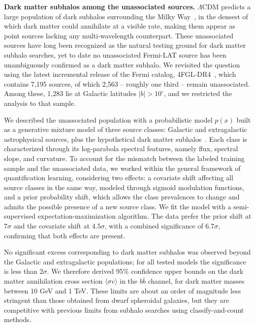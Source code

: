 
\textbf{Dark matter subhalos among the unassociated sources.} $\Lambda$CDM predicts a large population of dark subhalos surrounding the Milky Way~\cite{Springel:2008cc}, in the densest of which dark matter could annihilate at a visible rate, making them appear as point sources lacking any multi-wavelength counterpart. These unassociated sources have long been recognized as the natural testing ground for dark matter subhalo searches, yet to date no unassociated Fermi-LAT source has been unambiguously confirmed as a dark matter subhalo. We revisited the question using the latest incremental release of the Fermi catalog, 4FGL-DR4~\cite{Ballet:2023qzs}, which contains 7,195 sources, of which 2,563 -- roughly one third -- remain unassociated. Among these, 1,283 lie at Galactic latitudes $|b| > 10^\circ$, and we restricted the analysis to that sample.

We described the unassociated population with a probabilistic model $p(x)$ built as a generative mixture model of three source classes: Galactic and extragalactic astrophysical sources, plus the hypothetical dark matter subhalos~\cite{Amerio:2025fhz}. Each class is characterized through its log-parabola spectral features, namely flux, spectral slope, and curvature. To account for the mismatch between the labeled training sample and the unassociated data, we worked within the general framework of quantification learning, considering two effects: a covariate shift affecting all source classes in the same way, modeled through sigmoid modulation functions, and a prior probability shift, which allows the class prevalences to change and admits the possible presence of a new source class. We fit the model with a semi-supervised expectation-maximization algorithm. The data prefer the prior shift at $7\sigma$ and the covariate shift at $4.5\sigma$, with a combined significance of $6.7\sigma$, confirming that both effects are present.

No significant excess corresponding to dark matter subhalos was observed beyond the Galactic and extragalactic populations; for all tested models the significance is less than $2\sigma$. We therefore derived 95\% confidence upper bounds on the dark matter annihilation cross section $\langle \sigma v\rangle$ in the $b\bar{b}$ channel, for dark matter masses between 10 GeV and 1 TeV. These limits are about an order of magnitude less stringent than those obtained from dwarf spheroidal galaxies, but they are competitive with previous limits from subhalo searches using classify-and-count methods.

